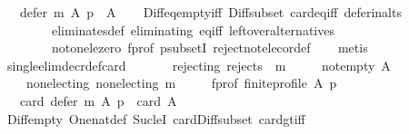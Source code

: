 \begin{isabellebody}
\ \ \ {\isachardoublequoteopen}defer\ m\ A\ p\ {\isasymsubset}\ A{\isachardoublequoteclose}\isanewline
%
\isadelimproof
\ \ %
\endisadelimproof
%
\isatagproof
{}\isamarkupfalse%
\ Diff{\isacharunderscore}{\kern0pt}eq{\isacharunderscore}{\kern0pt}empty{\isacharunderscore}{\kern0pt}iff\ Diff{\isacharunderscore}{\kern0pt}subset\ card{\isacharunderscore}{\kern0pt}eq{\isacharunderscore}{\kern0pt}{}{\isacharunderscore}{\kern0pt}iff\ defer{\isacharunderscore}{\kern0pt}in{\isacharunderscore}{\kern0pt}alts\isanewline
\ \ \ \ \ \ \ \ eliminates{\isacharunderscore}{\kern0pt}def\ eliminating\ eq{\isacharunderscore}{\kern0pt}iff\ leftover{\isacharunderscore}{\kern0pt}alternatives\isanewline
\ \ \ \ \ \ \ \ not{\isacharunderscore}{\kern0pt}one{\isacharunderscore}{\kern0pt}le{\isacharunderscore}{\kern0pt}zero\ f{\isacharunderscore}{\kern0pt}prof\ psubsetI\ reject{\isacharunderscore}{\kern0pt}not{\isacharunderscore}{\kern0pt}elec{\isacharunderscore}{\kern0pt}or{\isacharunderscore}{\kern0pt}def\isanewline
\ \ \isamarkupfalse%
\ metis%
\endisatagproof
{\isafoldproof}%
%
\isadelimproof
\isanewline
%
\endisadelimproof
\isanewline
{}\isamarkupfalse%
\ single{\isacharunderscore}{\kern0pt}elim{\isacharunderscore}{\kern0pt}decr{\isacharunderscore}{\kern0pt}def{\isacharunderscore}{\kern0pt}card{\isacharcolon}{\kern0pt}\isanewline
\ \ \isanewline
\ \ \ \ rejecting{\isacharcolon}{\kern0pt}\ {\isachardoublequoteopen}rejects\ {}\ m{\isachardoublequoteclose}\ \isanewline
\ \ \ \ not{\isacharunderscore}{\kern0pt}empty{\isacharcolon}{\kern0pt}\ {\isachardoublequoteopen}A\ {\isasymnoteq}\ {\isacharbraceleft}{\kern0pt}{\isacharbraceright}{\kern0pt}{\isachardoublequoteclose}\ \isanewline
\ \ \ \ non{\isacharunderscore}{\kern0pt}electing{\isacharcolon}{\kern0pt}\ {\isachardoublequoteopen}non{\isacharunderscore}{\kern0pt}electing\ m{\isachardoublequoteclose}\ \isanewline
\ \ \ \ f{\isacharunderscore}{\kern0pt}prof{\isacharcolon}{\kern0pt}\ {\isachardoublequoteopen}finite{\isacharunderscore}{\kern0pt}profile\ A\ p{\isachardoublequoteclose}\isanewline
\ \ \ {\isachardoublequoteopen}card\ {\isacharparenleft}{\kern0pt}defer\ m\ A\ p{\isacharparenright}{\kern0pt}\ {\isacharequal}{\kern0pt}\ card\ A\ {\isacharminus}{\kern0pt}\ {}{\isachardoublequoteclose}\isanewline
%
\isadelimproof
\ \ %
\endisadelimproof
%
\isatagproof
{}\isamarkupfalse%
\ Diff{\isacharunderscore}{\kern0pt}empty\ One{\isacharunderscore}{\kern0pt}nat{\isacharunderscore}{\kern0pt}def\ Suc{\isacharunderscore}{\kern0pt}leI\ card{\isacharunderscore}{\kern0pt}Diff{\isacharunderscore}{\kern0pt}subset\ card{\isacharunderscore}{\kern0pt}gt{\isacharunderscore}{\kern0pt}{}{\isacharunderscore}{\kern0pt}iff\isanewline

\end{isabellebody}
